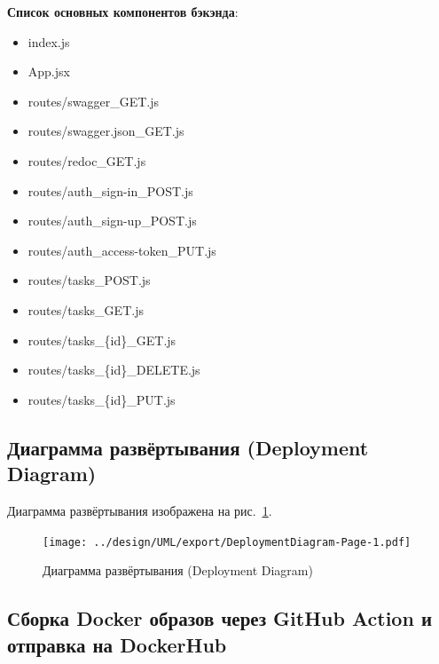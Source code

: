 \textbf{Список основных компонентов бэкэнда}:
\begin{itemize}
  \item index.js
  \item App.jsx
  \item routes/swagger\_GET.js
  \item routes/swagger.json\_GET.js
  \item routes/redoc\_GET.js
  \item routes/auth\_sign-in\_POST.js
  \item routes/auth\_sign-up\_POST.js
  \item routes/auth\_access-token\_PUT.js
  \item routes/tasks\_POST.js
  \item routes/tasks\_GET.js
  \item routes/tasks\_\{id\}\_GET.js
  \item routes/tasks\_\{id\}\_DELETE.js
  \item routes/tasks\_\{id\}\_PUT.js
\end{itemize}

\newpage
\subsection{Диаграмма развёртывания (Deployment Diagram)}

Диаграмма развёртывания изображена на рис.~\ref{fig:DeploymentDiagram}.

\begin{figure}[!h]
  \centering

  \texttt{[image: ../design/UML/export/DeploymentDiagram-Page-1.pdf]}

  \caption{Диаграмма развёртывания (Deployment Diagram)}
  \label{fig:DeploymentDiagram}
\end{figure}

\subsection{Сборка Docker образов через GitHub Action и отправка на DockerHub}

